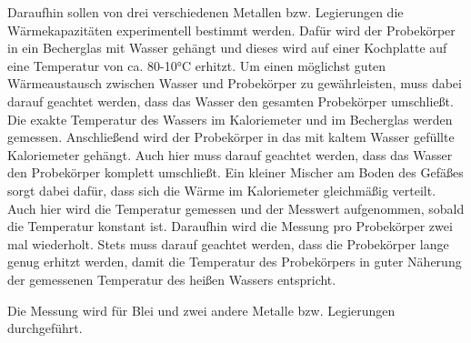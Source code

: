 Daraufhin sollen von drei verschiedenen Metallen bzw. Legierungen die Wärmekapazitäten
experimentell bestimmt werden. Dafür wird der Probekörper in ein Becherglas mit
Wasser gehängt und dieses wird auf einer Kochplatte auf eine Temperatur von ca. 80-10°C erhitzt.
Um einen möglichst guten Wärmeaustausch zwischen Wasser und Probekörper zu gewährleisten, muss dabei
darauf geachtet werden, dass das Wasser den gesamten Probekörper umschließt. Die
exakte Temperatur des Wassers im Kaloriemeter und im Becherglas werden gemessen.
Anschließend wird der Probekörper in das mit kaltem Wasser gefüllte Kaloriemeter gehängt. Auch
hier muss darauf geachtet werden, dass das Wasser den Probekörper komplett umschließt. Ein
kleiner Mischer am Boden des Gefäßes sorgt dabei dafür, dass sich die Wärme im Kaloriemeter
gleichmäßig verteilt. Auch hier wird die Temperatur gemessen und der Messwert aufgenommen,
sobald die Temperatur konstant ist. Daraufhin wird die Messung pro Probekörper zwei mal
wiederholt. Stets muss darauf geachtet werden, dass die Probekörper lange genug erhitzt
werden, damit die Temperatur des Probekörpers in guter Näherung der gemessenen Temperatur
des heißen Wassers entspricht.

Die Messung wird für Blei und zwei andere Metalle bzw. Legierungen durchgeführt.
